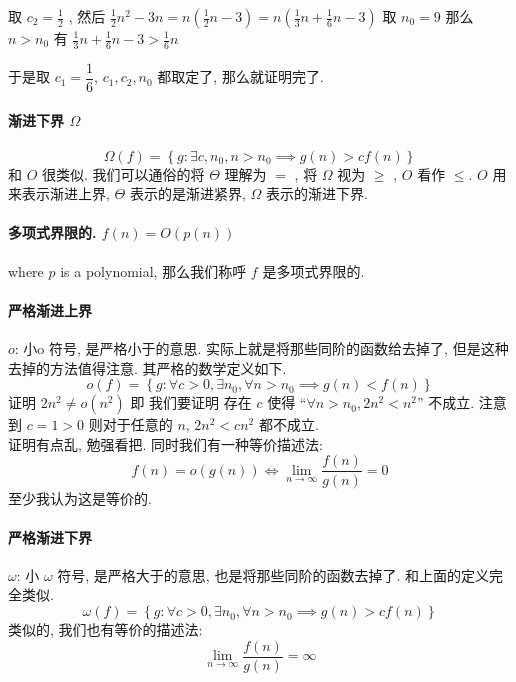 \documentclass[a4paper, 10pt]{ctexart} %
\begin{document}
取 $c_{2} = \frac{1}{2}$ , 
然后 
$\displaystyle  \frac{1}{2} n^{2}  - 3n = n \left(\frac{1}{2} n - 3\right) =n \left(\frac{1}{3} n+ \frac{1}{6} n - 3\right)$ 
取 $n_{0} = 9$ 那么 $n >n_{0}$ 有 
$\displaystyle  \frac{1}{3} n+ \frac{1}{6} n - 3 > \frac{1}{6} n$

于是取 $c_1 = \dfrac{1}{6}$,  $c_{1} ,c_{2} , n_{0}$ 都取定了, 那么就证明完了.

\paragraph*{渐进下界 $\Omega$} 
\[
\Omega \left(f\right) = \left\{ g: \exists c , n_{0}, n> n_{0} \implies g\left(n\right) > c f\left(n\right)\right\}
\]
和 $O$ 很类似. 我们可以通俗的将 $\Theta$ 理解为 $ = $ , 将 $\Omega$ 视为 $\ge$ , $O$ 看作 $\le$. 
$O$ 用来表示渐进上界, $\Theta$ 表示的是渐进紧界, $\Omega$ 表示的渐进下界.
\paragraph*{多项式界限的. $f\left(n\right) = O\left( p\left(n\right)\right)$} where $p$ is a polynomial, 那么我们称呼 $f$ 是多项式界限的.

\paragraph*{严格渐进上界} $o$: 小o 符号, 是严格小于的意思. 实际上就是将那些同阶的函数给去掉了, 但是这种去掉的方法值得注意. 其严格的数学定义如下.
\[
o \left(f\right) = \left\{ g: \forall  c >  0, \exists n_{0} , \forall n > n_{0} \implies g \left(n\right) < f \left(n\right)\right\}
\]
证明 $2 n^{2} \ne o \left(n^{2}\right)$ 即 我们要证明 存在 $c$ 使得 ``$\forall n > n_{0}, 2 n^{2} < n^{2}$'' 不成立. 注意到 $c = 1 >0 $ 则对于任意的 $n$, $ 2 n^{2} < cn^{2}$ 都不成立.\\
证明有点乱, 勉强看把. 
同时我们有一种等价描述法: 
$$f\left(n \right)   = o \left(g\left(n\right)\right) \iff  \lim_{n \to \infty} \frac{ f\left(n\right)}{g\left(n\right)} =  0$$
至少我认为这是等价的.

\paragraph*{严格渐进下界} $\omega$: 小 $\omega$ 符号, 是严格大于的意思, 也是将那些同阶的函数去掉了. 和上面的定义完全类似.
\[
\omega \left(f\right) = \left\{ g:\forall c > 0 , \exists n_{0} , \forall  n > n_{0} \implies g \left(n \right) > cf \left(n\right)\right\}
\]
类似的, 我们也有等价的描述法: 
$$ \lim_{n \to \infty} \frac{f\left(n\right)}{g\left(n\right)} = \infty$$
\end{document}
